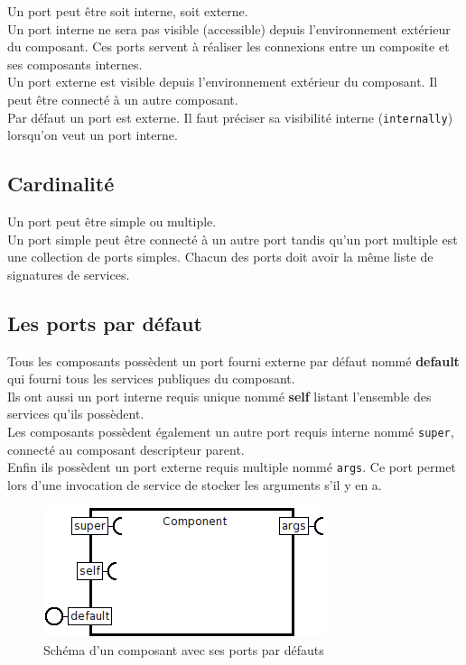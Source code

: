 \documentclass[11pt,a4paper,openany,oneside]{book}
\begin{document}
Un port peut être soit interne, soit externe.\\
Un port interne ne sera pas visible (accessible) depuis l'environnement extérieur du composant. Ces ports servent à réaliser les connexions entre un composite et ses composants internes.\\
Un port externe est visible depuis l'environnement extérieur du composant. Il peut être connecté à un autre composant.\\
Par défaut un port est externe. Il faut préciser sa visibilité interne (\texttt{internally}) lorsqu'on veut un port interne.

\subsection{Cardinalité}

Un port peut être simple ou multiple.\\
Un port simple peut être connecté à un autre port tandis qu'un port multiple est une collection de ports simples. Chacun des ports doit avoir la même liste de signatures de services.

\subsection{Les ports par défaut}

Tous les composants possèdent un port fourni externe par défaut nommé \textbf{default} qui fourni tous les services publiques du composant.\\
Ils ont aussi un port interne requis unique nommé \textbf{self} listant l'ensemble des services qu'ils possèdent.\\
Les composants possèdent également un autre port requis interne nommé \texttt{super}, connecté au composant descripteur parent.\\
Enfin ils possèdent un port externe requis multiple nommé \texttt{args}. Ce port permet lors d'une invocation de service de stocker les arguments s'il y en a.


\begin{figure}[H]
\centering
\includegraphics[scale=0.7, keepaspectratio=true]{compo}
\caption{Schéma d'un composant avec ses ports par défauts}
\label{args}
\end{figure}
\end{document}
